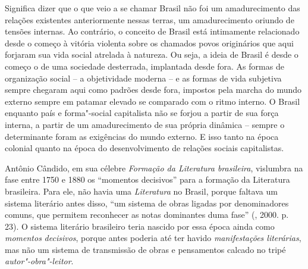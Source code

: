 Significa dizer que o que veio a se chamar Brasil não foi um
amadurecimento das relações existentes anteriormente nessas terras, um
amadurecimento oriundo de tensões internas. Ao contrário, o conceito de
Brasil está intimamente relacionado desde o começo à vitória violenta
sobre os chamados povos originários que aqui forjaram sua vida social
atrelada à natureza. Ou seja, a ideia de Brasil é desde o começo o de
uma sociedade desterrada, implantada desde fora. As formas de
organização social -- a objetividade moderna -- e as formas de vida
subjetiva sempre chegaram aqui como padrões desde fora, impostos pela
marcha do mundo externo sempre em patamar elevado se comparado com o
ritmo interno. O Brasil enquanto país e forma"-social capitalista não se
forjou a partir de sua força interna, a partir de um amadurecimento de
sua própria dinâmica -- sempre o determinante foram as exigências do
mundo externo. E isso tanto na época colonial quanto na época do
desenvolvimento de relações sociais capitalistas.

Antônio Cândido, em sua célebre \emph{Formação da Literatura
brasileira}, vislumbra na fase entre 1750 e 1880 os ``momentos
decisivos'' para a formação da Literatura brasileira. Para ele, não
havia uma \emph{Literatura} no Brasil, porque faltava um sistema
literário antes disso, ``um sistema de obras ligadas por denominadores
comuns, que permitem reconhecer as notas dominantes duma fase''
(, 2000. p. 23). O sistema literário brasileiro teria nascido por
essa época ainda como \emph{momentos} \emph{decisivos}, porque antes
poderia até ter havido \emph{manifestações literárias}, mas não um
sistema de transmissão de obras e pensamentos calcado no tripé
\emph{autor"-obra"-leitor}.

